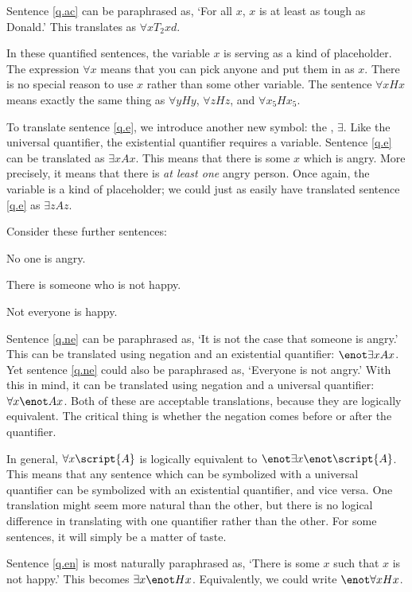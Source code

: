 Sentence \ref{q.ac} can be paraphrased as, `For all $x$, $x$ is at least as tough as Donald.' This translates as $\forall x T_2xd$.

In these quantified sentences, the variable $x$ is serving as a kind of placeholder. The expression $\forall x$ means that you can pick anyone and put them in as $x$. There is no special reason to use $x$ rather than some other variable. The sentence $\forall x Hx$ means exactly the same thing as $\forall y Hy$, $\forall z Hz$, and $\forall x_5 Hx_5$.

To translate sentence \ref{q.e}, we introduce another new symbol: the , $\exists$. Like the universal quantifier, the existential quantifier requires a variable. Sentence \ref{q.e} can be translated as $\exists x Ax$. This means that there is some $x$ which is angry. More precisely, it means that there is \emph{at least one} angry person. Once again, the variable is a kind of placeholder; we could just as easily have translated sentence \ref{q.e} as $\exists z Az$.

Consider these further sentences:
\begin{earg}
\item[\ex{q.ne}] No one is angry.
\item[\ex{q.en}] There is someone who is not happy.
\item[\ex{q.na}] Not everyone is happy.
\end{earg}

Sentence \ref{q.ne} can be paraphrased as, `It is not the case that someone is angry.' This can be translated using negation and an existential quantifier: $\enot \exists x Ax$. Yet sentence \ref{q.ne} could also be paraphrased as, `Everyone is not angry.' With this in mind, it can be translated using negation and a universal quantifier: $\forall x \enot Ax$. Both of these are acceptable translations, because they are logically equivalent. The critical thing is whether the negation comes before or after the quantifier.

In general, $\forall x\script{A}$ is logically equivalent to $\enot\exists x\enot\script{A}$. This means that any sentence which can be symbolized with a universal quantifier can be symbolized with an existential quantifier, and vice versa. One translation might seem more natural than the other, but there is no logical difference in translating with one quantifier rather than the other. For some sentences, it will simply be a matter of taste.

Sentence \ref{q.en} is most naturally paraphrased as, `There is some $x$ such that $x$ is not happy.' This becomes $\exists x \enot Hx$. Equivalently, we could write $\enot\forall x Hx$.

